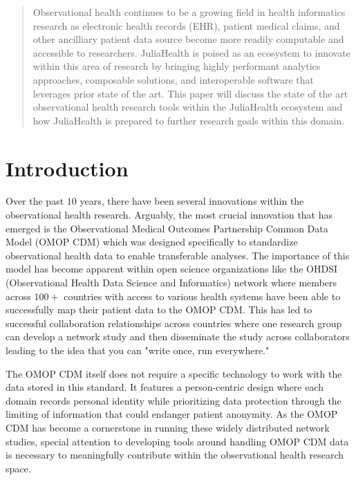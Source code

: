 \documentclass{juliacon}
\begin{document}


\maketitle

\begin{abstract}

Observational health continues to be a growing field in health informatics research as electronic health records (EHR), patient medical claims, and other ancilliary patient data source become more readily computable and accessible to researchers.
JuliaHealth is poised as an ecosystem to innovate within this area of research by bringing highly performant analytics approaches, composable solutions, and interoperable software that leverages prior state of the art. 
This paper will discuss the state of the art observational health research tools within the JuliaHealth ecosystem and how JuliaHealth is prepared to further research goals within this domain.

\end{abstract}

\section{Introduction}

Over the past $10$ years, there have been several innovations within the observational health research.
Arguably, the most crucial innovation that has emerged is the Observational Medical Outcomes Partnership Common Data Model (OMOP CDM) which was designed specifically to standardize observational health data to enable transferable analyses.
The importance of this model has become apparent within open science organizations like the OHDSI (Observational Health Data Science and Informatics) network where members across $100+$ countries with access to various health systems have been able to successfully map their patient data to the OMOP CDM.
This has led to successful collaboration relationships across countries where one research group can develop a network study and then disseminate the study across collaborators leading to the idea that you can "write once, run everywhere."

The OMOP CDM itself does not require a specific technology to work with the data stored in this standard.
It features a person-centric design where each domain records personal identity while prioritizing data protection through the limiting of information that could endanger patient anonymity.
As the OMOP CDM has become a cornerstone in running these widely distributed network studies, special attention to developing tools around handling OMOP CDM data is necessary to meaningfully contribute within the observational health research space.
\end{document}
